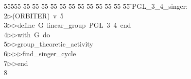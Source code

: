 %
%
\begin{tabbing}
55555 \= 55 \= 55 \= 55 \= 55 \= 55 \= 55 \= 55 \= 55 \= 55 \= 55 \= 55 \= 55 \= \>PGL\_3\_4\_singer:\\[0pt]
2\>$\triangleright$\>(ORBITER)\ v\ 5\ \\[0pt]
3\>$\triangleright$\>$\triangleright$\>define\ G\ linear\_group\ PGL\ 3\ 4\ end\ \\[0pt]
4\>$\triangleright$\>$\triangleright$\>with\ G\ do\ \\[0pt]
5\>$\triangleright$\>$\triangleright$\>group\_theoretic\_activity\ \\[0pt]
6\>$\triangleright$\>$\triangleright$\>$\triangleright$\>find\_singer\_cycle\ \\[0pt]
7\>$\triangleright$\>$\triangleright$\>end\\[0pt]
8\>\end{tabbing}
